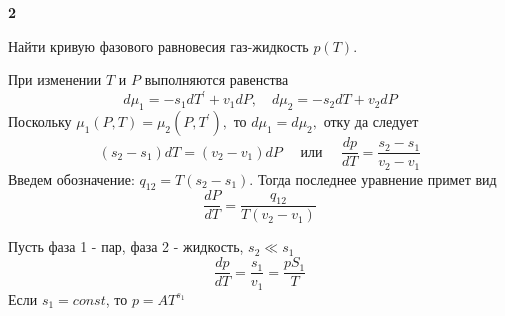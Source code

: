 \documentclass[a4paper,12pt]{article} %
\begin{document}
\begin{ttask} \textbf{2}

Найти кривую фазового равновесия газ-жидкость $ p(T) $.


При изменении $T$ и $P$ выполняются равенства
$$
d \mu_{1}=-s_{1} d T^{\prime}+v_{1} d P, \quad d \mu_{2}=-s_{2} d T+v_{2} d P
$$
Поскольку $\mu_{1}(P, T)=\mu_{2}\left(P, T^{\prime}\right),$ то $d \mu_{1}=d \mu_{2},$ отку да следует
$$
\left(s_{2}-s_{1}\right) d T=\left(v_{2}-v_{1}\right) d P \quad \text { или } \quad \frac{d p}{d T}=\frac{s_{2}-s_{1}}{v_{2}-v_{1}}
$$
Введем обозначение: $q_{12}=T\left(s_{2}-s_{1}\right) .$ Тогда последнее уравнение примет вид
$$
\frac{d P}{d T}=
\frac{q_{12}}{T\left(v_{2}-v_{1}\right)}
$$


Пусть фаза 1 - пар, фаза 2 - жидкость, $ s_2 \ll s_1 $
\[ \frac{d p}{d T}=\frac{s_1}{v_1}=\frac{pS_1}{T} \]
Если $ s_1=const$, то $ p=AT^{s_1} $

\end{ttask}
\end{document}

